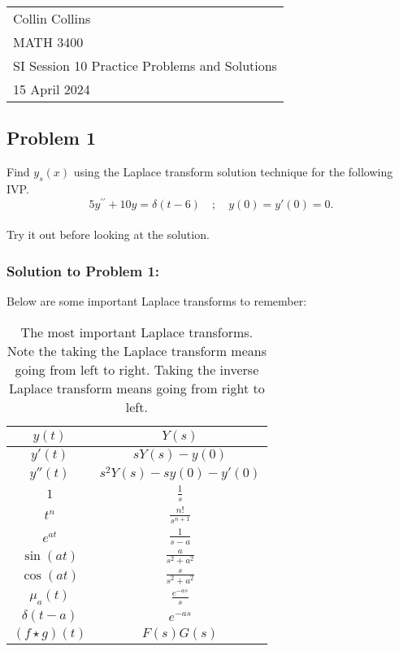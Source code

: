\documentclass[a4paper,12pt]{article}
\begin{document}

\thispagestyle{empty}

\begin{tabular}{p{15.5cm}}
\\ Collin Collins \\
MATH 3400\\
SI Session 10 Practice Problems and Solutions\\
15 April 2024 \\
\hline

\end{tabular} 

\subsection*{Problem 1} Find $y_s(x)$ using the Laplace transform solution technique for the following IVP.
$$5y^{\prime \prime}+ 10y= \delta(t-6) \quad ; \quad y(0)=y'(0)=0 . $$
\\
 
Try it out before looking at the solution.
\pagebreak
 
\subsubsection*{Solution to Problem 1:}

Below are some important Laplace transforms to remember:

\begin{table}[ht!]
\begin{center}
\renewcommand{\arraystretch}{1.3}
\begin{tabular}{| c | c |}
\hline
$y(t)$ & $Y(s)$ \\
\hline
$y'(t)$ & $sY(s) - y(0)$ \\
\hline
$y''(t)$ & $s^2Y(s) - sy(0) - y'(0)$ \\
\hline
$1$ & $\displaystyle\tfrac{1}{s}$ \\
\hline
$t^n$ & $\displaystyle\tfrac{n!}{s^{n+1}}$ \\
\hline
$e^{at}$ & $\displaystyle\tfrac{1}{s-a}$ \\
\hline
$\sin{(at)}$ & $\displaystyle\tfrac{a}{s^2 + a^2}$ \\
\hline
$\cos{(at)}$ & $\displaystyle\tfrac{s}{s^2 + a^2}$ \\
\hline
$\mu_{a}(t)$ & $\displaystyle\tfrac{e^{-as}}{s}$ \\
\hline
$\delta(t-a)$ & $e^{-as}$ \\
\hline
$(f \star g)(t)$ & $F(s)G(s)$ \\
\hline
\end{tabular}
\end{center}
\caption{The most important Laplace transforms. Note the taking the Laplace transform means going from left to right. Taking the inverse Laplace transform means going from right to left.}
\label{table}
\end{table}
\end{document}
